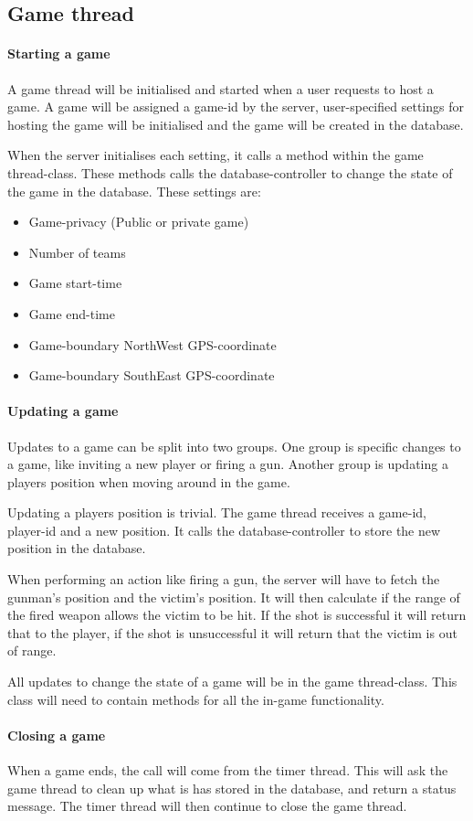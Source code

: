 \subsection{Game thread}
\paragraph{Starting a game}
A game thread will be initialised and started when a user requests to host a game. A game will be assigned a game-id by the server, user-specified settings for hosting the game will be initialised and the game will be created in the database. 

When the server initialises each setting, it calls a method within the game thread-class. These methods calls the database-controller to change the state of the game in the database. These settings are:
\begin{itemize}
\item Game-privacy (Public or private game)
\item Number of teams
\item Game start-time
\item Game end-time
\item Game-boundary NorthWest GPS-coordinate
\item Game-boundary SouthEast GPS-coordinate
\end{itemize}

\paragraph{Updating a game}
Updates to a game can be split into two groups. One group is specific changes to a game, like inviting a new player or firing a gun. Another group is updating a players position when moving around in the game.

Updating a players position is trivial. The game thread receives a game-id, player-id and a new position. It calls the database-controller to store the new position in the database.

When performing an action like firing a gun, the server will have to fetch the gunman's position and the victim's position. It will then calculate if the range of the fired weapon allows the victim to be hit. If the shot is successful it will return that to the player, if the shot is unsuccessful it will return that the victim is out of range. 

All updates to change the state of a game will be in the game thread-class. This class will need to contain methods for all the in-game functionality. 

\paragraph{Closing a game}
When a game ends, the call will come from the timer thread. This will ask the game thread to clean up what is has stored in the database, and return a status message. The timer thread will then continue to close the game thread. 